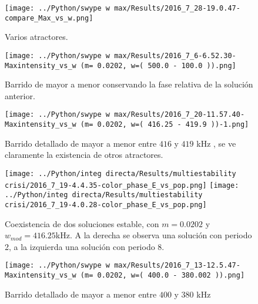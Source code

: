 	
	\begin{figure}[htp]
		\begin{center}
			\texttt{[image: ../Python/swype w max/Results/2016\_7\_28-19.0.47-compare\_Max\_vs\_w.png]}
		\end{center}
		\caption{Varios atractores.}
		\label{202 colores}
	\end{figure}
	
	
	\begin{figure}[htp]
		\begin{center}
			\texttt{[image: ../Python/swype w max/Results/2016\_7\_6-6.52.30-Maxintensity\_vs\_w (m= 0.0202, w=( 500.0 - 100.0 )).png]}
		\end{center}
		\caption{Barrido de mayor a menor conservando la fase relativa de la solución anterior.}
	\end{figure}
	
	
	
	\begin{figure}[htp]
		\begin{center}
			\texttt{[image: ../Python/swype w max/Results/2016\_7\_20-11.57.40-Maxintensity\_vs\_w (m= 0.0202, w=( 416.25 - 419.9 ))-1.png]}
		\end{center}
		\caption{Barrido detallado de mayor a menor entre $416$ y $419$ kHz , se ve claramente la existencia de otros atractores.}
	\end{figure}
	
	
	\begin{figure}[htp]
		\texttt{[image: ../Python/integ directa/Results/multiestability crisi/2016\_7\_19-4.4.35-color\_phase\_E\_vs\_pop.png]}
		\texttt{[image: ../Python/integ directa/Results/multiestability crisi/2016\_7\_19-4.0.28-color\_phase\_E\_vs\_pop.png]}
		\caption{Coexistencia de dos soluciones estable, con $m=0.0202$ y $w_{mod}=416.25$kHz. A la derecha se observa una solución con periodo 2, a la izquierda una solución con periodo 8.}
	\end{figure}
	
	
	
	\begin{figure}[htp]
		\begin{center}
			\texttt{[image: ../Python/swype w max/Results/2016\_7\_13-12.5.47-Maxintensity\_vs\_w (m= 0.0202, w=( 400.0 - 380.002 )).png]}
		\end{center}
		\caption{Barrido detallado  de mayor a menor entre $400$ y $380$ kHz }
	\end{figure}	
	
